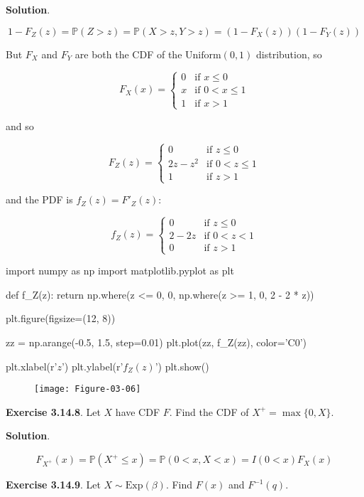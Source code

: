 \textbf{Solution}.

\[1 - F_Z(z) = \mathbb{P}(Z > z) = \mathbb{P}(X > z, Y > z) = (1 - F_X(z)) (1 - F_Y(z)) \]

But \(F_X\) and \(F_Y\) are both the CDF of the \(\text{Uniform}(0, 1)\)
distribution, so

\[ F_X(x) = \begin{cases}
0 &\text{if } x \leq 0 \\
x &\text{if } 0 < x \leq 1 \\
1 &\text{if } x > 1
\end{cases} \]

and so

\[ F_Z(z) = \begin{cases}
0 &\text{if } z \leq 0 \\
2z - z^2 &\text{if } 0 < z \leq 1 \\
1 &\text{if } z > 1
\end{cases} \]

and the PDF is \(f_Z(z) = F'_Z(z)\):

\[ f_Z(z) = \begin{cases}
0 &\text{if } z \leq 0 \\
2 - 2z &\text{if } 0 < z < 1 \\
0 &\text{if } z > 1
\end{cases} \]

\begin{python}
import numpy as np
import matplotlib.pyplot as plt

def f_Z(z):
    return np.where(z <= 0, 0, np.where(z >= 1, 0, 2 - 2 * z))

plt.figure(figsize=(12, 8))

zz = np.arange(-0.5, 1.5, step=0.01)
plt.plot(zz, f_Z(zz), color='C0')
    
plt.xlabel(r'$z$')
plt.ylabel(r'$f_Z(z)$')
plt.show()
\end{python}

\begin{figure}[H]
\texttt{[image: Figure-03-06]}
\end{figure}

\textbf{Exercise 3.14.8}. Let \(X\) have CDF \(F\). Find the CDF of
\(X^+ = \max \{0, X\}\).

\textbf{Solution}.

\[ F_{X^+}(x) = \mathbb{P}(X^+ \leq x) = \mathbb{P}(0 < x, X < x) = I(0 < x) F_X(x) \]

\textbf{Exercise 3.14.9}. Let \(X \sim \text{Exp}(\beta)\). Find
\(F(x)\) and \(F^{-1}(q)\).

